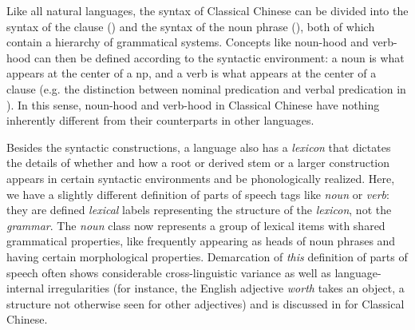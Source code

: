 \documentclass[UTF8, a4paper, oneside, scheme=plain, 12pt]{ctexrep}
\newcommand*{\term}[1]{\emph{#1}}
\newcommand{\form}[1]{\emph{#1}}
\begin{document}
Like all natural languages, the syntax of Classical Chinese can be divided into 
the syntax of the clause () and the syntax of the noun phrase (),
both of which contain a hierarchy of grammatical systems.
Concepts like noun-hood and verb-hood can then be defined according to the syntactic environment:
a noun is what appears at the center of a \ac{np},
and a verb is what appears at the center of a clause
(e.g. the distinction between nominal predication and verbal predication 
in ).
In this sense, noun-hood and verb-hood in Classical Chinese have nothing inherently different from their counterparts in other languages.

Besides the syntactic constructions, 
a language also has a \emph{lexicon} that dictates 
the details of whether and how a root or derived stem or a larger construction appears
in certain syntactic environments and be phonologically realized.
Here, we have a slightly different definition of 
parts of speech tags like \term{noun} or \term{verb}:
they are defined \emph{lexical} labels 
representing the structure of the \emph{lexicon}, not the \emph{grammar}.
The \term{noun} class now represents a group of lexical items with shared grammatical properties,
like frequently appearing as heads of noun phrases and having certain morphological properties.
Demarcation of \emph{this} definition of parts of speech often shows considerable cross-linguistic variance as well as language-internal irregularities (for instance, the English adjective \form{worth} takes an object, a structure not otherwise seen for other adjectives) and is discussed in  for Classical Chinese.
\end{document}

